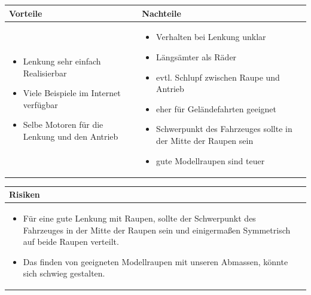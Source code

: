 \begin{table}[h]
\begin{tabular}{p{} | p{}}


 \textbf{Vorteile} & \textbf{Nachteile} \\ \hline
	 
\begin{itemize}
\item Lenkung sehr einfach Realisierbar
\item Viele Beispiele im Internet verfügbar
\item Selbe Motoren für die Lenkung und den Antrieb
\end{itemize}

 
 &
 
\begin{itemize}
\item Verhalten bei Lenkung unklar
\item Längsämter als Räder
\item evtl. Schlupf zwischen Raupe und Antrieb
\item eher für Geländefahrten geeignet
\item Schwerpunkt des Fahrzeuges sollte in der Mitte der Raupen sein
\item gute Modellraupen sind teuer
\end{itemize}

\end{tabular}
\end{table}

\begin{table}[h]
\begin{tabular}{p{}p{}}


 \textbf{Risiken} & \\ \hline
	 
\begin{itemize}
\item Für eine gute Lenkung mit Raupen, sollte der Schwerpunkt des Fahrzeuges in der Mitte der Raupen sein und einigermaßen Symmetrisch auf beide Raupen verteilt.
\item Das finden von geeigneten Modellraupen mit unseren Abmassen, könnte sich schwieg gestalten.
\end{itemize}


 
\end{tabular}
\end{table}

\pagebreak


